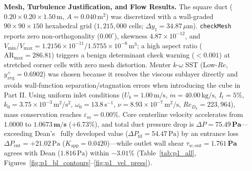 \documentclass[10pt,a4paper]{article}
\begin{document}
\textbf{Mesh, Turbulence Justification, and Flow Results.} The square duct ($0.20 \times 0.20 \times 1.50\,\text{m}$, $A = 0.040\,\text{m}^2$) was discretized with a wall-graded $90 \times 90 \times 150$ hexahedral grid ($1{,}215{,}000$ cells; $\Delta y_1 = 34.87\,\mu\text{m}$). \texttt{checkMesh} reports zero non-orthogonality ($0.00^\circ$), skewness $4.87\times 10^{-12}$, and $V_{\min}/V_{\max} = 1.2156\times 10^{-11} / 1.5755\times 10^{-6}\,\text{m}^3$; a high aspect ratio ($\text{AR}_{\max} = 286.81$) triggers a benign determinant check warning ($<0.001$) at stretched corner cells with zero mesh distortion. Menter $k$-$\omega$ SST (Low-$Re$, $y^+_{\text{avg}} = 0.6902$) was chosen because it resolves the viscous sublayer directly and avoids wall-function separation/stagnation errors when introducing the cube in Part II. Using uniform inlet conditions ($U_b = 1.00\,\text{m/s}$, $\dot{m} = 40.00\,\text{kg/s}$, $I_t = 5\%$, $k_0 = 3.75\times 10^{-3}\,\text{m}^2/\text{s}^2$, $\omega_0 = 13.8\,\text{s}^{-1}$, $\nu = 8.93\times 10^{-7}\,\text{m}^2/\text{s}$, $Re_{D_h} = 223{,}964$), mass conservation reaches $\varepsilon_m = \mathbf{0.00\%}$. Core centerline velocity accelerates from $1.0000$ to $\mathbf{1.0673\,\text{m/s}}$ ($+6.73\%$), and total duct pressure drop is $\Delta P = \mathbf{75.49\,\text{Pa}}$---exceeding Dean's~\cite{dean1978} fully developed value ($\Delta P_{\text{fd}} = 54.47\,\text{Pa}$) by an entrance loss $\Delta P_{\text{ent}} = +21.02\,\text{Pa}$ ($K_{\text{app}} = 0.0420$)---while outlet wall shear $\tau_{w,\text{out}} = \mathbf{1.761\,\text{Pa}}$ agrees with Dean ($1.816\,\text{Pa}$) within $\mathbf{-3.01\%}$ (Table~\ref{tab:p1_all}, Figures~\ref{fig:p1_bl_contours}--\ref{fig:p1_vel_press}).
\end{document}
